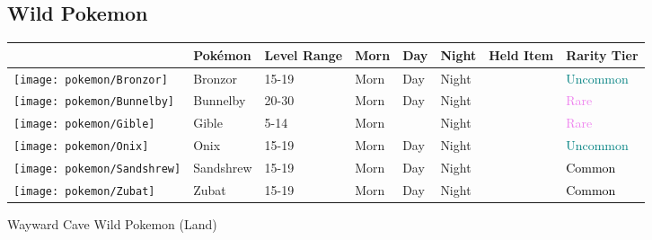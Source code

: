 \subsection{Wild Pokemon}%
\label{subsec:WildPokemon}%
\begin{longtable}{||l l l l l l l l||}%
\hline%
&Pokémon&Level Range&Morn&Day&Night&Held Item&Rarity Tier\\%
\hline%
\endhead%
\hline%
\texttt{[image: pokemon/Bronzor]}&Bronzor&15{-}19&Morn&Day&Night&&\textcolor{teal}{%
Uncommon%
}\\%
\hline%
\texttt{[image: pokemon/Bunnelby]}&Bunnelby&20{-}30&Morn&Day&Night&&\textcolor{violet}{%
Rare%
}\\%
\hline%
\texttt{[image: pokemon/Gible]}&Gible&5{-}14&Morn&&Night&&\textcolor{violet}{%
Rare%
}\\%
\hline%
\texttt{[image: pokemon/Onix]}&Onix&15{-}19&Morn&Day&Night&&\textcolor{teal}{%
Uncommon%
}\\%
\hline%
\texttt{[image: pokemon/Sandshrew]}&Sandshrew&15{-}19&Morn&Day&Night&&\textcolor{black}{%
Common%
}\\%
\hline%
\texttt{[image: pokemon/Zubat]}&Zubat&15{-}19&Morn&Day&Night&&\textcolor{black}{%
Common%
}\\%
\hline%
\end{longtable}%
\caption{Wayward Cave Wild Pokemon (Land)}